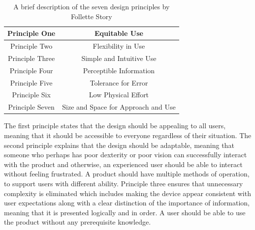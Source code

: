 \begin{table}
    \begin{center}
        \begin{tabular}{ |c|c| } %
        \hline
        Principle One & Equitable Use \cite{sevenprinciples} \\
        \hline
        Principle Two & Flexibility in Use \cite{sevenprinciples} \\ 
        \hline
        Principle Three & Simple and Intuitive Use \cite{sevenprinciples} \\ 
        \hline
        Principle Four & Perceptible Information \cite{sevenprinciples} \\
        \hline 
        Principle Five & Tolerance for Error \cite{sevenprinciples} \\ 
        \hline
        Principle Six & Low Physical Effort \cite{sevenprinciples} \\ 
        \hline
        Principle Seven & Size and Space for Approach and Use \cite{sevenprinciples} \\
        \hline
        \end{tabular}
    \end{center}
    \caption{A brief description of the seven design principles by Follette Story \cite{sevenprinciples}}
    \label{fig:DesignPrinciples}
\end{table}

The first principle states that the design should be appealing to all users, meaning that it should be accessible to everyone regardless of their situation.
The second principle explains that the design should be adaptable, meaning that someone who perhaps has poor dexterity or poor vision can successfully interact with the product and otherwise, an experienced user should be able to interact without feeling frustrated. %
A product should have multiple methods of operation, to support users with different ability.
Principle three ensures that unnecessary complexity is eliminated which includes making the device appear consistent with user expectations along with a clear distinction of the importance of information, meaning that it is presented logically and in order.
A user should be able to use the product without any prerequisite knowledge.

